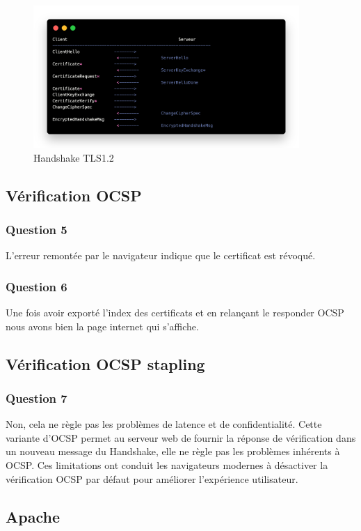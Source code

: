 \documentclass[12pt, a4paper]{article}
\begin{document}
\begin{figure}[h]
    \centering
    \includegraphics[width=0.9\textwidth]{img/handshake.png}
    \caption{Handshake TLS1.2}
    \label{fig:handshake}
\end{figure}

\subsection{Vérification OCSP}
\subsubsection*{Question 5}
L'erreur remontée par le navigateur indique que le certificat est révoqué. 

\subsubsection*{Question 6}
Une fois avoir exporté l'index des certificats et en relançant le responder OCSP nous avons 
bien la page internet qui s'affiche. 

\subsection{Vérification OCSP stapling}
\subsubsection*{Question 7}
Non, cela ne règle pas les problèmes de latence et de confidentialité. Cette variante 
d'OCSP permet au serveur web de fournir la réponse de vérification dans un nouveau 
message du Handshake, elle ne règle pas les problèmes inhérents à OCSP. Ces limitations ont conduit les navigateurs 
modernes à désactiver la vérification OCSP par défaut pour améliorer l'expérience 
utilisateur.

\subsection{Apache}
\end{document}

